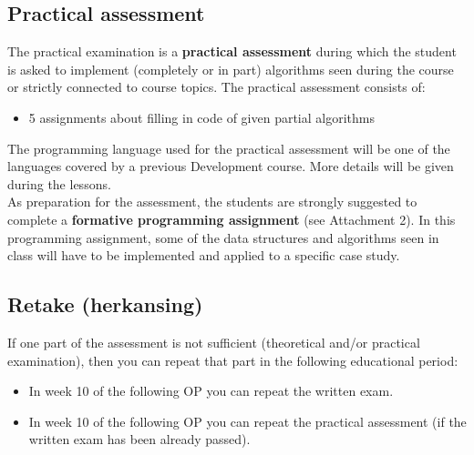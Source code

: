 	\subsection{Practical assessment}
	The practical examination is a \textbf{practical assessment} during which the student is asked to implement (completely or in part) algorithms seen during the course or strictly connected to course topics. The practical assessment consists of:
	\begin{itemize}
		\item 5 assignments about filling in code of given partial algorithms
	\end{itemize}
	
	The programming language used for the practical assessment will be one of the languages covered by a previous Development course. More details will be given during the lessons.\\
	
	As preparation for the assessment, the students are strongly suggested to complete a \textbf{formative programming assignment} (see Attachment 2). In this programming assignment, some of the data structures and algorithms seen in class will have to be implemented and applied to a specific case study.\\ 

	
	\subsection{Retake (herkansing)}
	If one part of the assessment is not sufficient (theoretical and/or practical examination), then you can repeat that part in the following educational period:
	\begin{itemize}
	\item In week 10 of the following OP you can repeat the written exam.
	\item In week 10 of the following OP you can repeat the practical assessment (if the written exam has been already passed).
	\end{itemize}
	
